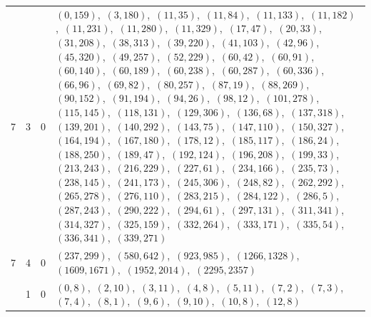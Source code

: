 \documentclass[11pt]{article}
\begin{document}
\begin{longtable}{@{}rrl>{\raggedright\arraybackslash}p{}@{}}
7 & 3 & $0$ & $(0,159)$,\allowbreak\ $(3,180)$,\allowbreak\ $(11,35)$,\allowbreak\ $(11,84)$,\allowbreak\ $(11,133)$,\allowbreak\ $(11,182)$,\allowbreak\ $(11,231)$,\allowbreak\ $(11,280)$,\allowbreak\ $(11,329)$,\allowbreak\ $(17,47)$,\allowbreak\ $(20,33)$,\allowbreak\ $(31,208)$,\allowbreak\ $(38,313)$,\allowbreak\ $(39,220)$,\allowbreak\ $(41,103)$,\allowbreak\ $(42,96)$,\allowbreak\ $(45,320)$,\allowbreak\ $(49,257)$,\allowbreak\ $(52,229)$,\allowbreak\ $(60,42)$,\allowbreak\ $(60,91)$,\allowbreak\ $(60,140)$,\allowbreak\ $(60,189)$,\allowbreak\ $(60,238)$,\allowbreak\ $(60,287)$,\allowbreak\ $(60,336)$,\allowbreak\ $(66,96)$,\allowbreak\ $(69,82)$,\allowbreak\ $(80,257)$,\allowbreak\ $(87,19)$,\allowbreak\ $(88,269)$,\allowbreak\ $(90,152)$,\allowbreak\ $(91,194)$,\allowbreak\ $(94,26)$,\allowbreak\ $(98,12)$,\allowbreak\ $(101,278)$,\allowbreak\ $(115,145)$,\allowbreak\ $(118,131)$,\allowbreak\ $(129,306)$,\allowbreak\ $(136,68)$,\allowbreak\ $(137,318)$,\allowbreak\ $(139,201)$,\allowbreak\ $(140,292)$,\allowbreak\ $(143,75)$,\allowbreak\ $(147,110)$,\allowbreak\ $(150,327)$,\allowbreak\ $(164,194)$,\allowbreak\ $(167,180)$,\allowbreak\ $(178,12)$,\allowbreak\ $(185,117)$,\allowbreak\ $(186,24)$,\allowbreak\ $(188,250)$,\allowbreak\ $(189,47)$,\allowbreak\ $(192,124)$,\allowbreak\ $(196,208)$,\allowbreak\ $(199,33)$,\allowbreak\ $(213,243)$,\allowbreak\ $(216,229)$,\allowbreak\ $(227,61)$,\allowbreak\ $(234,166)$,\allowbreak\ $(235,73)$,\allowbreak\ $(238,145)$,\allowbreak\ $(241,173)$,\allowbreak\ $(245,306)$,\allowbreak\ $(248,82)$,\allowbreak\ $(262,292)$,\allowbreak\ $(265,278)$,\allowbreak\ $(276,110)$,\allowbreak\ $(283,215)$,\allowbreak\ $(284,122)$,\allowbreak\ $(286,5)$,\allowbreak\ $(287,243)$,\allowbreak\ $(290,222)$,\allowbreak\ $(294,61)$,\allowbreak\ $(297,131)$,\allowbreak\ $(311,341)$,\allowbreak\ $(314,327)$,\allowbreak\ $(325,159)$,\allowbreak\ $(332,264)$,\allowbreak\ $(333,171)$,\allowbreak\ $(335,54)$,\allowbreak\ $(336,341)$,\allowbreak\ $(339,271)$\\
7 & 4 & $0$ & $(237,299)$,\allowbreak\ $(580,642)$,\allowbreak\ $(923,985)$,\allowbreak\ $(1266,1328)$,\allowbreak\ $(1609,1671)$,\allowbreak\ $(1952,2014)$,\allowbreak\ $(2295,2357)$\\
\addlinespace[3pt]
13 & 1 & $0$ & $(0,8)$,\allowbreak\ $(2,10)$,\allowbreak\ $(3,11)$,\allowbreak\ $(4,8)$,\allowbreak\ $(5,11)$,\allowbreak\ $(7,2)$,\allowbreak\ $(7,3)$,\allowbreak\ $(7,4)$,\allowbreak\ $(8,1)$,\allowbreak\ $(9,6)$,\allowbreak\ $(9,10)$,\allowbreak\ $(10,8)$,\allowbreak\ $(12,8)$\\

\end{longtable}
\end{document}
